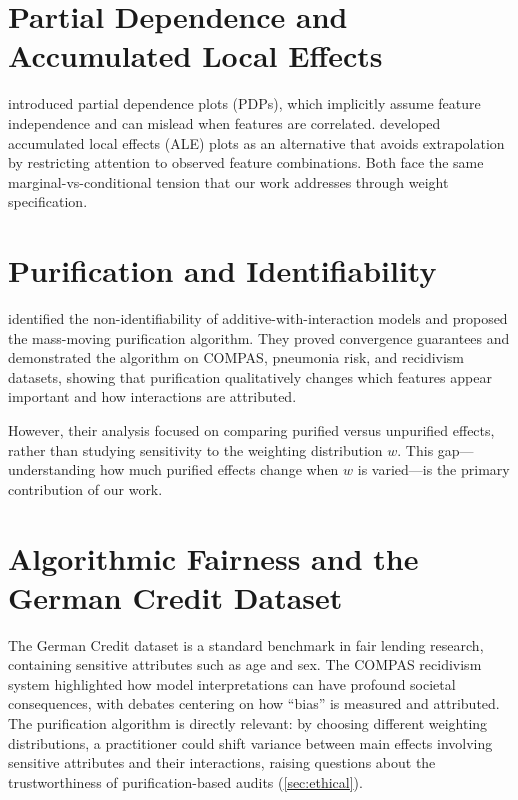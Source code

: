 \section{Partial Dependence and Accumulated Local Effects}

\citet{friedman2001greedy} introduced partial dependence plots (PDPs), which implicitly assume feature independence and can mislead when features are correlated.
\citet{apley2020visualizing} developed accumulated local effects (ALE) plots as an alternative that avoids extrapolation by restricting attention to observed feature combinations.
Both face the same marginal-vs-conditional tension that our work addresses through weight specification.

\section{Purification and Identifiability}

\citet{lengerich2020purifying} identified the non-identifiability of additive-with-interaction models and proposed the mass-moving purification algorithm.
They proved convergence guarantees and demonstrated the algorithm on COMPAS, pneumonia risk, and recidivism datasets, showing that purification qualitatively changes which features appear important and how interactions are attributed.

However, their analysis focused on comparing purified versus unpurified effects, rather than studying sensitivity to the weighting distribution $w$.
This gap---understanding how much purified effects change when $w$ is varied---is the primary contribution of our work.

\section{Algorithmic Fairness and the German Credit Dataset}

The German Credit dataset \citep{dua2019uci} is a standard benchmark in fair lending research, containing sensitive attributes such as age and sex.
The COMPAS recidivism system \citep{angwin2016machine} highlighted how model interpretations can have profound societal consequences, with debates centering on how ``bias'' is measured and attributed.
The purification algorithm is directly relevant: by choosing different weighting distributions, a practitioner could shift variance between main effects involving sensitive attributes and their interactions, raising questions about the trustworthiness of purification-based audits (\cref{sec:ethical}).
